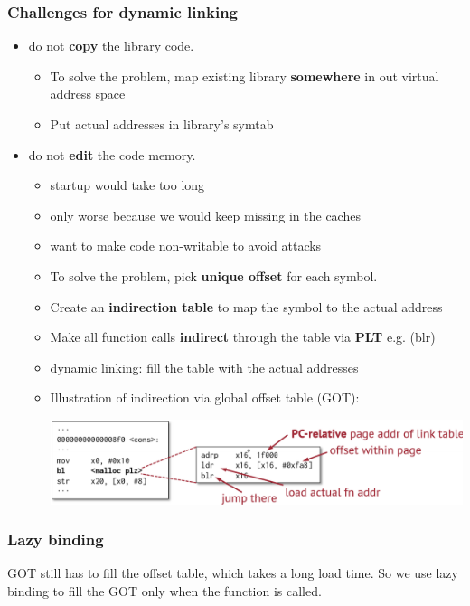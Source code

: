 \documentclass[letterpaper,12pt]{article}
\begin{document}
\subsubsection{Challenges for dynamic linking}
\begin{itemize}
    \item do not \textbf{copy} the library code.\begin{itemize}
        \item To solve the problem, map existing library \textbf{somewhere} in out virtual address space
        \item Put actual addresses in library's symtab
    \end{itemize}
    \item do not \textbf{edit} the code memory.\begin{itemize}
        \item startup would take too long
        \item only worse because we would keep missing in the caches
        \item want to make code non-writable to avoid attacks
        \item To solve the problem, pick \textbf{unique offset} for each symbol. 
        \item Create an \textbf{indirection table} to map the symbol to the actual address
        \item Make all function calls \textbf{indirect} through the table via \textbf{PLT} e.g. (blr)
        \item dynamic linking: fill the table with the actual addresses
        \item Illustration of indirection via global offset table (GOT):
        
        \includegraphics*[scale=0.6]{./Images/Global offset table.png}
    \end{itemize}
\end{itemize}
\subsubsection{Lazy binding}
GOT still has to fill the offset table, which takes a long load time. So we use lazy binding to fill the GOT only when the function is called.
\end{document}
